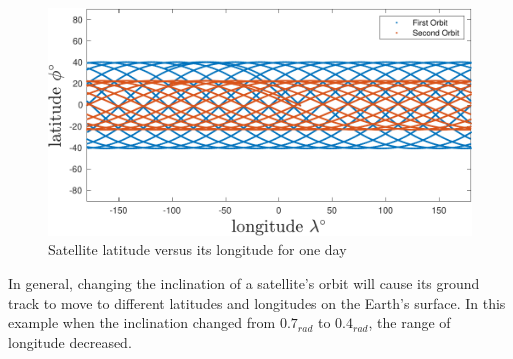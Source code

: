 \begin{figure}[H]
    \caption{Satellite latitude versus its longitude for one day}
    \centering
    \includegraphics[width=16cm]{../Figure/Q2/latlong_compare}
\end{figure}
In general, changing the inclination of a satellite's orbit will cause its ground track to move to different latitudes and longitudes on the Earth's surface. In this example when the inclination changed from $0.7_{rad}$ to $0.4_{rad}$, the range of longitude decreased.